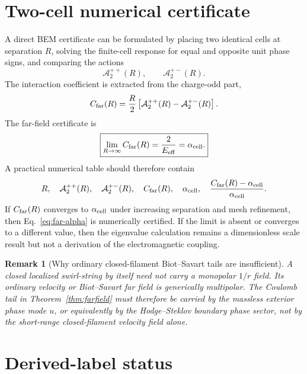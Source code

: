 \documentclass[11pt]{article}
\newcommand{\Eeff}{E_{\rm eff}}
\newcommand{\alphacell}{\alpha_{\rm cell}}
\newcommand{\Cfar}{C_{\rm far}}
\newcommand{\Atwo}{\mathcal A_{2}}
\newtheorem{remark}{Remark}
\begin{document}
\section{Two-cell numerical certificate}
\label{sec:twocell}

A direct BEM certificate can be formulated by placing two identical cells at separation \(R\), solving the finite-cell response for equal and opposite unit phase signs, and comparing the actions
\begin{equation}
\Atwo^{++}(R),
\qquad
\Atwo^{+-}(R).
\end{equation}
The interaction coefficient is extracted from the charge-odd part,
\begin{equation}
\Cfar(R)
=
\frac{R}{2}\left[\Atwo^{++}(R)-\Atwo^{+-}(R)\right].
\label{eq:CfarR}
\end{equation}
The far-field certificate is
\begin{equation}
\boxed{
\lim_{R\to\infty}\Cfar(R)=\frac{2}{\Eeff}=\alphacell.
}
\label{eq:certificate}
\end{equation}
A practical numerical table should therefore contain
\begin{equation}
R,
\quad
\Atwo^{++}(R),
\quad
\Atwo^{+-}(R),
\quad
\Cfar(R),
\quad
\alphacell,
\quad
\frac{\Cfar(R)-\alphacell}{\alphacell}.
\end{equation}
If \(\Cfar(R)\) converges to \(\alphacell\) under increasing separation and mesh refinement, then Eq.~\eqref{eq:far-alpha} is numerically certified. If the limit is absent or converges to a different value, then the eigenvalue calculation remains a dimensionless scale result but not a derivation of the electromagnetic coupling.

\begin{remark}[Why ordinary closed-filament Biot--Savart tails are insufficient]
A closed localized swirl-string by itself need not carry a monopolar \(1/r\) field. Its ordinary velocity or Biot--Savart far field is generically multipolar. The Coulomb tail in Theorem~\ref{thm:farfield} must therefore be carried by the massless exterior phase mode \(u\), or equivalently by the Hodge--Steklov boundary phase sector, not by the short-range closed-filament velocity field alone.
\end{remark}


\section{Derived-label status}
\end{document}
